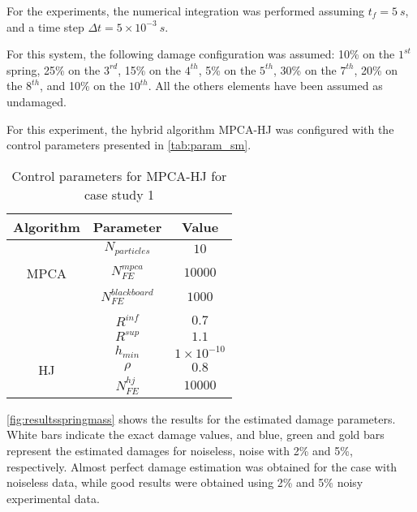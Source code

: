 For the experiments, the numerical integration was performed assuming $t_f = 5~s$, and a time step $\Delta t=5\times 10^{-3}~s$.

For this system, the following damage configuration was assumed: 10\% on the $1^{st}$ spring, 25\% on the $3^{rd}$, 15\% on the $4^{th}$, 5\% on the $5^{th}$, 30\% on the $7^{th}$, 20\% on the $8^{th}$, and 10\% on the $10^{th}$. All the others elements have been assumed as undamaged.

For this experiment, the hybrid algorithm MPCA-HJ was configured with the control parameters presented in \autoref{tab:param_sm}.

\begin{table}[H]
\caption{Control parameters for MPCA-HJ for case study 1}
\label{tab:param_sm}
\footnotesize
\centering
\begin{tabular}{ccc}
\hline
Algorithm & Parameter & Value \\
\hline
\multirow{5}{*}{MPCA} & $N_{particles}$ & $10$ \\
\\[-0.7em]
& $N_{FE}^{mpca}$ & $10000$ \\
\\[-0.7em]
 & $N_{FE}^{blackboard}$ & $1000$ \\
\\[-0.7em]
 & $R^{inf}$ & $0.7$ \\
 & $R^{sup}$ & $1.1$ \\
\hline
\multirow{3}{*}{HJ} & $h_{min}$ & $1 \times 10^{-10}$ \\
 & $\rho $ & $0.8$ \\
 & $N_{FE}^{hj}$ & $10000$ \\
\hline
\end{tabular}
\end{table}

\autoref{fig:resultsspringmass} shows the results for the estimated damage parameters. White bars indicate the exact damage values, and blue, green and gold bars represent the estimated damages for noiseless, noise with 2\% and 5\%, respectively. Almost perfect damage estimation was obtained for the case with noiseless data, while good results were obtained using 2\% and 5\% noisy experimental data.

